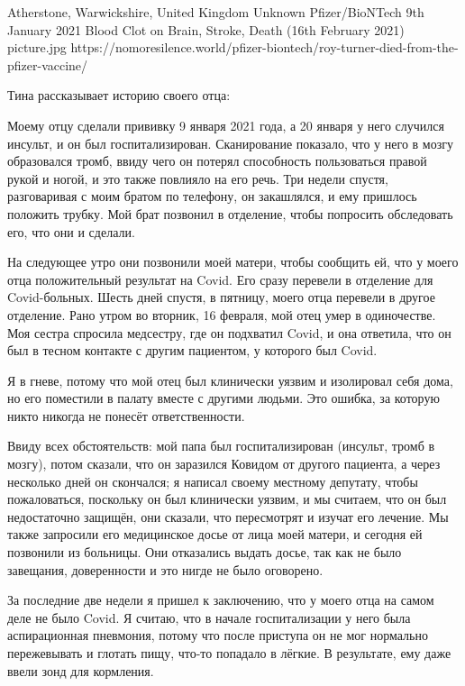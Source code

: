 {Atherstone, Warwickshire, United Kingdom}
{Unknown}
{Pfizer/BioNTech}
{9th January 2021}
{Blood Clot on Brain, Stroke, Death (16th February 2021)}
{picture.jpg}
{https://nomoresilence.world/pfizer-biontech/roy-turner-died-from-the-pfizer-vaccine/}
{

Тина рассказывает историю своего отца:

Моему отцу сделали прививку 9 января 2021 года, а 20 января у него случился
инсульт, и он был госпитализирован. Сканирование показало, что у него в мозгу
образовался тромб, ввиду чего он потерял способность пользоваться правой рукой и
ногой, и это также повлияло на его речь. Три недели спустя, разговаривая с моим
братом по телефону, он закашлялся, и ему пришлось положить трубку. Мой брат
позвонил в отделение, чтобы попросить обследовать его, что они и сделали.

На следующее утро они позвонили моей матери, чтобы сообщить ей, что у моего отца
положительный результат на Covid. Его сразу перевели в отделение для
Covid-больных. Шесть дней спустя, в пятницу, моего отца перевели в другое
отделение. Рано утром во вторник, 16 февраля, мой отец умер в одиночестве. Моя
сестра спросила медсестру, где он подхватил Covid, и она ответила, что он был в
тесном контакте с другим пациентом, у которого был Covid.

Я в гневе, потому что мой отец был клинически уязвим и изолировал себя дома, но
его поместили в палату вместе с другими людьми. Это ошибка, за которую никто
никогда не понесёт ответственности.

Ввиду всех обстоятельств: мой папа был госпитализирован (инсульт, тромб в
мозгу), потом сказали, что он заразился Ковидом от другого пациента, а через
несколько дней он скончался; я написал своему местному депутату, чтобы
пожаловаться, поскольку он был клинически уязвим, и мы считаем, что он был
недостаточно защищён, они сказали, что пересмотрят и изучат его лечение. Мы
также запросили его медицинское досье от лица моей матери, и сегодня ей
позвонили из больницы. Они отказались выдать досье, так как не было завещания,
доверенности и это нигде не было оговорено.

За последние две недели я пришел к заключению, что у моего отца на самом деле не
было Covid. Я считаю, что в начале госпитализации у него была аспирационная
пневмония, потому что после приступа он не мог нормально пережевывать и глотать
пищу, что-то попадало в лёгкие. В результате, ему даже ввели зонд для кормления.

}
